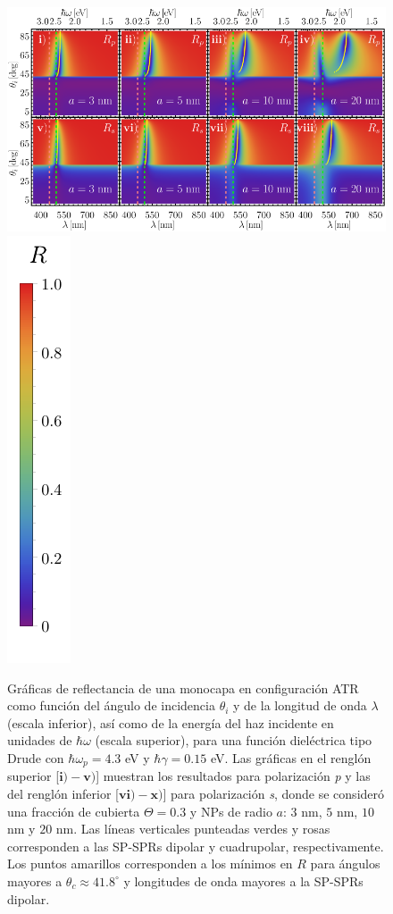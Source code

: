 	\begin{figure}[h!]\centering
\includegraphics[width = .75\linewidth]{2-Resultados/figs/3-Wp4rVar/0-2D_Grid}%
\includegraphics[scale=.85, trim={00 -5 00 00}, clip]{2-Resultados/figs/0-RBar_v}\vspace*{-.5em}
	\caption{Gráficas de reflectancia de una monocapa en configuración ATR como función del ángulo de incidencia $\theta_i$ y de la longitud de onda $\lambda$ (escala inferior), así como de la energía del haz incidente en unidades de $\hbar\omega$ (escala superior), para una función dieléctrica tipo Drude con $\hbar\omega_p=4.3$ eV  y  $\hbar\gamma=0. 15$ eV.  Las gráficas   en el renglón superior [$\mathbf{i)-v)}$] muestran los resultados para  polarización \emph{p} y las del renglón inferior  [$\mathbf{vi)-x)}$]  para polarización  \emph{s}, donde se consideró una fracción de cubierta $\Theta = 0.3$ y  NPs de radio  $a$: $3$ nm, $5$ nm, $10$ nm y $20$ nm.  Las líneas verticales punteadas verdes y rosas corresponden a las SP-SPRs dipolar y  cuadrupolar, respectivamente.  Los puntos amarillos corresponden a los mínimos en $R$ para ángulos mayores a $\theta_c\approx 41.8^\circ$ y longitudes de onda mayores a la SP-SPRs dipolar.
}	\label{fig:R-RVar}	
	\end{figure}	

